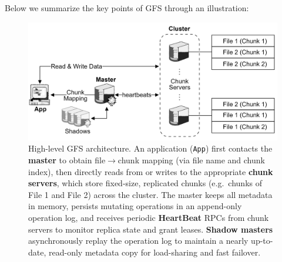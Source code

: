 \newpage 

\noindent
Below we summarize the key points of GFS through an illustration:
\begin{figure}[h]
  \centering
  \includegraphics[width=\textwidth]{Sections/gfs/high.png}
  \caption{High-level GFS architecture. An application (\texttt{App}) first contacts the \textbf{master} to obtain file$\to$chunk mapping (via file name and chunk index), then directly reads from or writes to the appropriate \textbf{chunk servers}, 
  which store fixed-size, replicated chunks (e.g.\ chunks of File 1 and File 2) across the cluster. The master keeps all metadata in memory, persists mutating operations in an append-only operation log, and receives periodic \textbf{HeartBeat} RPCs from chunk servers to monitor 
  replica state and grant leases. \textbf{Shadow masters} asynchronously replay the operation log to maintain a nearly up-to-date, read-only metadata copy for load-sharing and fast failover.}
  \label{fig:gfs-summary}
\end{figure}


